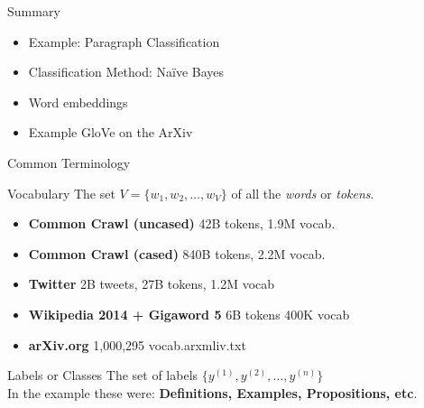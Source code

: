 \documentclass[handout]{beamer}
\begin{document}
\begin{frame}{Summary}
    \begin{itemize}
            \item Example: Paragraph Classification
            \item Classification Method: Na\"ive Bayes
            \item Word embeddings
            \item Example GloVe on the ArXiv 
    \end{itemize}
\end{frame}
\begin{frame}{Common Terminology}
    \begin{exampleblock}{Vocabulary}
        The set $V = \{w_1,w_2,\ldots, w_V\}$ of all the \textit{words} or \textit{tokens}.
    \end{exampleblock}
        \begin{itemize}
            \item \textbf{Common Crawl (uncased)} 42B tokens, 1.9M vocab.
            \item \textbf{Common Crawl (cased)} 840B tokens, 2.2M vocab.
            \item \textbf{Twitter} 2B tweets, 27B tokens, 1.2M vocab
            \item \textbf{Wikipedia 2014 + Gigaword 5} 6B tokens 400K vocab
            \item \textbf{arXiv.org} 1,000,295 vocab.arxmliv.txt
        \end{itemize}

        \begin{exampleblock}{Labels or Classes}
            The set of labels $\{y^{(1)},y^{(2)},\ldots, y^{(n)}\}$\\
            In the example these were: \textbf{Definitions, Examples, Propositions, etc}.
        \end{exampleblock}


\end{frame}
\end{document}
